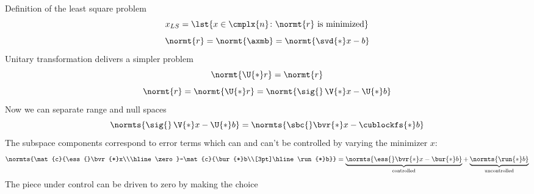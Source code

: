 Definition of the least square problem
  \begin{equation}
      x_{LS} = \lst{x\in\cmplx{n} \colon \normt{r} \text{ is minimized}}
  \end{equation}
  \begin{equation}
      \normt{r} = \normt{\axmb} = \normt{\svd{*}x - b}
  \end{equation}
Unitary transformation delivers a simpler problem
  \begin{equation}
      \normt{\U{*}r} = \normt{r}
  \end{equation}
  \begin{equation}
      \normt{r} = \normt{\U{*}r} = \normt{\sig{}\,\V{*}x-\U{*}b}
  \end{equation}
Now we can separate range and null spaces
  \begin{equation}
      \normts{\sig{}\,\V{*}x-\U{*}b} = \normts{\sbc{}\bvr{*}x-\cublockfs{*}b}
  \end{equation}
The subspace components correspond to error terms which can and can't be controlled by varying the minimizer $x$:
  \begin{equation}
      \normts{\mat{c}{\ess{}\bvr{*}x\\\hline\zero}-\mat{c}{\bur{*}b\\[3pt]\hline\run{*}b}} = 
      \underbrace{\normts{\ess{}\bvr{*}x-\bur{*}b}}_{\text{controlled}} + 
      \underbrace{\normts{\run{*}b}}_{\text{uncontrolled}}
  \end{equation}
The piece under control can be driven to zero by making the choice
